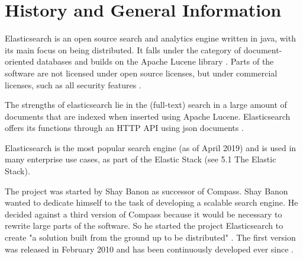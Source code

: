 \chapter{History and General Information}

Elasticsearch is an open source search and analytics engine written in java, with its main focus on being distributed. It falls under the category of document-oriented databases and builds on the Apache Lucene library \autocite{andrewcholakian2019}. Parts of the software are not licensed under open source licenses, but under commercial licenses, such as all security features \autocite{elasticsearc_sec}.

The strengths of elasticsearch lie in the (full-text) search in a large amount of documents that are indexed when inserted using Apache Lucene. Elasticsearch offers its functions through an HTTP API using json documents \autocite{andrewcholakian2019}.

Elasticsearch is the most popular search engine (as of April 2019) \autocite{soliditgmbh2019} and is used in many enterprise use cases, as part of the Elastic Stack (see 5.1 The Elastic Stack).

The project was started by Shay Banon as successor of Compass. Shay Banon wanted to dedicate himself to the task of developing a scalable search engine. He decided against a third version of Compass because it would be necessary to rewrite large parts of the software. So he started the project Elasticsearch to create "a solution built from the ground up to be distributed" \autocite{shaybanon2019}. The first version was released in February 2010 and has been continuously developed ever since \autocite{elasticsearchb.v.2019}.

